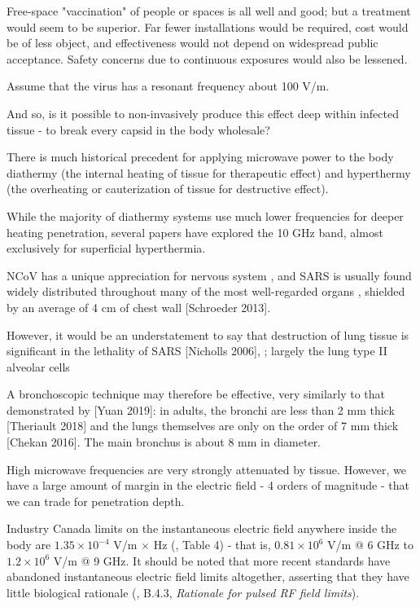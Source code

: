 \documentclass[paper.tex]{subfiles}
\begin{document}
Free-space "vaccination" of people or spaces is all well and good; but a treatment would seem to be superior. Far fewer installations would be required, cost would be of less object, and effectiveness would not depend on widespread public acceptance. Safety concerns due to continuous exposures would also be lessened.

Assume that the virus has a resonant frequency about 100 V/m. 

And so, is it possible to non-invasively produce this effect deep within infected tissue - to break every capsid in the body wholesale?
 
There is much historical precedent for applying microwave power to the body diathermy (the internal heating of tissue for therapeutic effect) and hyperthermy (the overheating or cauterization of tissue for destructive effect). 

While the majority of diathermy systems use much lower frequencies for deeper heating penetration, several papers have explored the 10 GHz band, almost exclusively for superficial hyperthermia.

NCoV has a unique appreciation for nervous system \cite{neuroinvasive2020}, and SARS is usually found widely distributed throughout many of the most well-regarded organs \cite{Organ2004}, shielded by an average of 4 cm of chest wall [Schroeder 2013]. 

However, it would be an understatement to say that destruction of lung tissue is significant in the lethality of SARS [Nicholls 2006], \cite{situ2020}; largely the lung type II alveolar cells 



A bronchoscopic technique may therefore be effective, very similarly to that demonstrated by [Yuan 2019]: in adults, the bronchi are less than 2 mm thick [Theriault 2018] and the lungs themselves are only on the order of 7 mm thick [Chekan 2016]. The main bronchus is about 8 mm in diameter.

High microwave frequencies are very strongly attenuated by tissue. However, we have a large amount of margin in the electric field - 4 orders of magnitude - that we can trade for penetration depth.

Industry Canada limits on the instantaneous electric field anywhere inside the body are $1.35 \times 10^{-4}$ V/m $\times$ Hz (\cite{RSS1022015}, Table 4) - that is, $0.81 \times 10^6$ V/m @ 6 GHz to $1.2 \times 10^6$ V/m @ 9 GHz. It should be noted that more recent standards have abandoned instantaneous electric field limits altogether, asserting that they have little biological rationale (\cite{C95}, B.4.3, {\it Rationale for pulsed RF field limits}).\footnotemark
\end{document}
